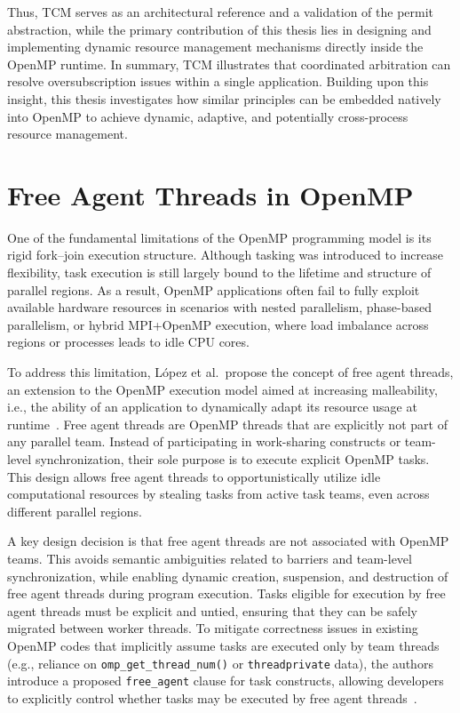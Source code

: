 Thus, TCM serves as an architectural reference and a validation of the permit abstraction, while the primary contribution of this thesis lies in designing and implementing dynamic resource management mechanisms directly inside the OpenMP runtime. In summary, TCM illustrates that coordinated arbitration can resolve oversubscription issues within a single application. Building upon this insight, this thesis investigates how similar principles can be embedded natively into OpenMP to achieve dynamic, adaptive, and potentially cross-process resource management.

\chapter{Free Agent Threads in OpenMP}\label{chapter:free_agent_threads}

One of the fundamental limitations of the OpenMP programming model is its rigid fork--join execution structure. Although tasking was introduced to increase flexibility, task execution is still largely bound to the lifetime and structure of parallel regions. As a result, OpenMP applications often fail to fully exploit available hardware resources in scenarios with nested parallelism, phase-based parallelism, or hybrid MPI+OpenMP execution, where load imbalance across regions or processes leads to idle CPU cores.

To address this limitation, López et al.\ propose the concept of free agent threads, an extension to the OpenMP execution model aimed at increasing malleability, i.e., the ability of an application to dynamically adapt its resource usage at runtime~\parencite{mcintosh-smith_openmp_2021}. Free agent threads are OpenMP threads that are explicitly not part of any parallel team. Instead of participating in work-sharing constructs or team-level synchronization, their sole purpose is to execute explicit OpenMP tasks. This design allows free agent threads to opportunistically utilize idle computational resources by stealing tasks from active task teams, even across different parallel regions.

A key design decision is that free agent threads are not associated with OpenMP teams. This avoids semantic ambiguities related to barriers and team-level synchronization, while enabling dynamic creation, suspension, and destruction of free agent threads during program execution. Tasks eligible for execution by free agent threads must be explicit and untied, ensuring that they can be safely migrated between worker threads. To mitigate correctness issues in existing OpenMP codes that implicitly assume tasks are executed only by team threads (e.g., reliance on \texttt{omp\_get\_thread\_num()} or \texttt{threadprivate} data), the authors introduce a proposed \texttt{free\_agent} clause for task constructs, allowing developers to explicitly control whether tasks may be executed by free agent threads~\parencite{mcintosh-smith_openmp_2021}.

